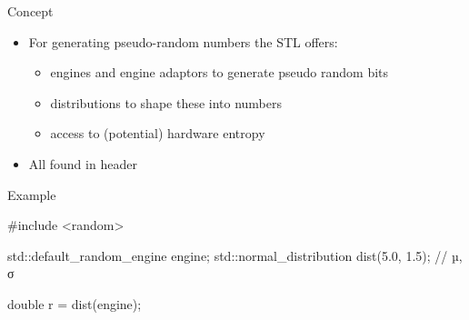 
\begin{frame}[fragile]
  \begin{block}{Concept}
    \begin{itemize}
      \item For generating pseudo-random numbers the STL offers:
      \begin{itemize}
        \item engines and engine adaptors to generate pseudo random bits
        \item distributions to shape these into numbers
        \item access to (potential) hardware entropy
      \end{itemize}
      \item All found in header 
    \end{itemize}
  \end{block}
  \begin{exampleblock}{Example}
    \begin{cppcode}
      #include <random>

      std::default_random_engine engine;
      std::normal_distribution dist(5.0, 1.5); // µ, σ

      double r = dist(engine);
    \end{cppcode}
  \end{exampleblock}
\end{frame}

